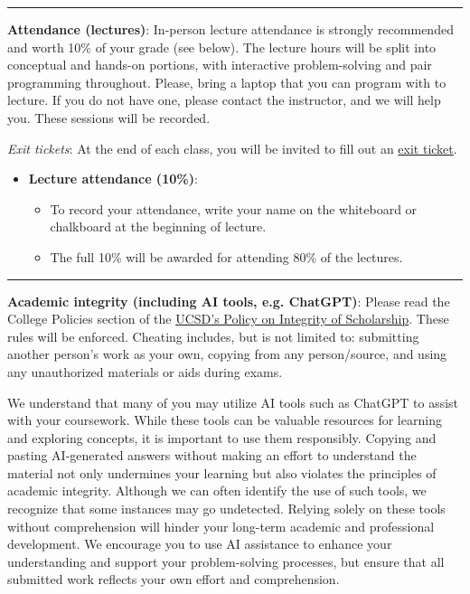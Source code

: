 \documentclass[12pt]{article}
\begin{document}
\begin{center}
	\rule{\textwidth}{0.5pt}
\end{center}

\noindent\textbf{Attendance (lectures)}: In-person lecture attendance is strongly recommended and worth 10\% of your grade (see below).
The lecture hours will be split into conceptual and hands-on portions, with interactive problem-solving and pair programming throughout.
Please, bring a laptop that you can program with to lecture.
If you do not have one, please contact the instructor, and we will help you.
These sessions will be recorded.

\emph{Exit tickets}: At the end of each class, you will be invited to fill out an \href{https://forms.gle/4DmG5SjBUEM5pe6U8}{exit ticket}.

\begin{itemize}
	\itemsep-0.3em
	\item \textbf{Lecture attendance (10\%)}:
	      \begin{itemize}
		      \itemsep-0.3em
		      \item To record your attendance, write your name on the whiteboard or chalkboard at the beginning of lecture.
		      \item The full 10\% will be awarded for attending 80\% of the lectures.
	      \end{itemize}
\end{itemize}

\begin{center}
	\rule{\textwidth}{0.5pt}
\end{center}



\noindent\textbf{Academic integrity (including AI tools, e.g. ChatGPT)}: Please read the College Policies section of the \href{http://senate.ucsd.edu/Operating-Procedures/Senate-Manual/Appendices/2}{UCSD's Policy on Integrity of Scholarship}.
These rules will be enforced.
Cheating includes, but is not limited to: submitting another person's work as your own, copying from any person/source, and using any unauthorized materials or aids during exams.

We understand that many of you may utilize AI tools such as ChatGPT to assist with your coursework.
While these tools can be valuable resources for learning and exploring concepts, it is important to use them responsibly.
Copying and pasting AI-generated answers without making an effort to understand the material not only undermines your learning but also violates the principles of academic integrity.
Although we can often identify the use of such tools, we recognize that some instances may go undetected.
Relying solely on these tools without comprehension will hinder your long-term academic and professional development.
We encourage you to use AI assistance to enhance your understanding and support your problem-solving processes, but ensure that all submitted work reflects your own effort and comprehension.
\end{document}
